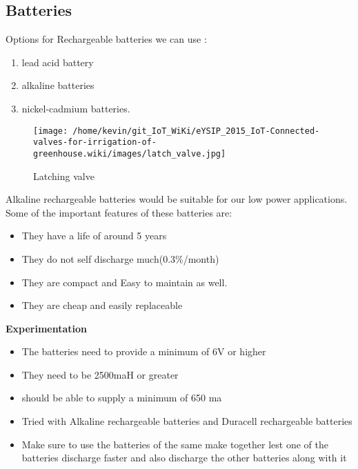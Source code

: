 \documentclass[16pt]{article}
\begin{document}
\hfill




\subsection{Batteries}

\hfill


Options for Rechargeable batteries we can use :
\hfill

\begin{enumerate}

\item
  lead acid battery
\item
  alkaline batteries
\item
  nickel-cadmium batteries.
\end{enumerate}

\hfill

\begin{figure}
\hspace{3cm}
\texttt{[image: /home/kevin/git\_IoT\_WiKi/eYSIP\_2015\_IoT-Connected-valves-for-irrigation-of-greenhouse.wiki/images/latch\_valve.jpg]}
\caption{Latching valve}
\end{figure}
\vspace{0.4cm}

Alkaline rechargeable batteries would be suitable for our low power
applications. Some of the important features of these batteries are:
\hfill
\begin{itemize}

\item
  They have a life of around 5 years
\item
  They do not self discharge much(0.3\%/month)
\item
  They are compact and Easy to maintain as well.
\item
  They are cheap and easily replaceable
\end{itemize}

\hfill

{\Large{\textbf{Experimentation}}}

\begin{itemize}

\item
  The batteries need to provide a minimum of 6V or higher
\item
  They need to be 2500maH or greater
\item
  should be able to supply a minimum of 650 ma
\item
  Tried with Alkaline rechargeable batteries and Duracell rechargeable
  batteries
\item
  Make sure to use the batteries of the same make together lest one of
  the batteries discharge faster and also discharge the other batteries
  along with it
\end{itemize}
\end{document}
